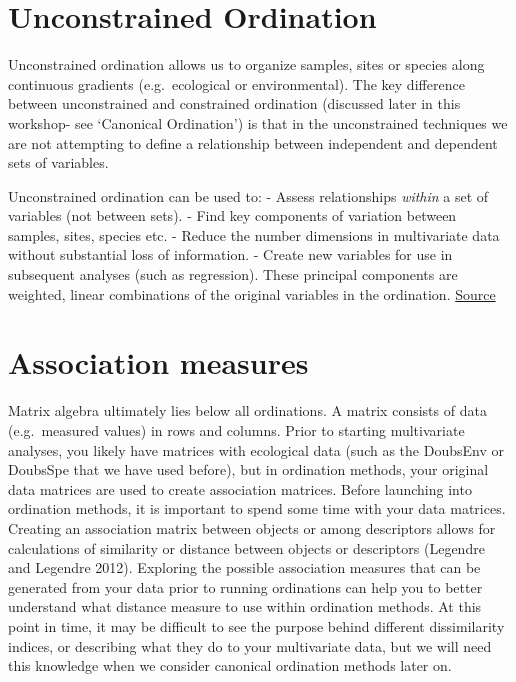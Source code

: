 \documentclass[
]{book}
\begin{document}
\hypertarget{unconstrained-ordination}{%
\chapter{Unconstrained Ordination}\label{unconstrained-ordination}}

Unconstrained ordination allows us to organize samples, sites or species
along continuous gradients (e.g.~ecological or environmental). The key
difference between unconstrained and constrained ordination (discussed
later in this workshop- see `Canonical Ordination') is that in the
unconstrained techniques we are not attempting to define a relationship
between independent and dependent sets of variables.

Unconstrained ordination can be used to: - Assess relationships \emph{within}
a set of variables (not between sets). - Find key components of
variation between samples, sites, species etc. - Reduce the number
dimensions in multivariate data without substantial loss of information.
- Create new variables for use in subsequent analyses (such as
regression). These principal components are weighted, linear
combinations of the original variables in the ordination.
\href{http://www.umass.edu/landeco/teaching/multivariate/schedule/ordination1.pdf}{Source}

\hypertarget{association-measures}{%
\chapter{Association measures}\label{association-measures}}

Matrix algebra ultimately lies below all ordinations. A matrix consists
of data (e.g.~measured values) in rows and columns. Prior to starting
multivariate analyses, you likely have matrices with ecological data
(such as the DoubsEnv or DoubsSpe that we have used before), but in
ordination methods, your original data matrices are used to create
association matrices. Before launching into ordination methods, it is
important to spend some time with your data matrices. Creating an
association matrix between objects or among descriptors allows for
calculations of similarity or distance between objects or descriptors
(Legendre and Legendre 2012). Exploring the possible association
measures that can be generated from your data prior to running
ordinations can help you to better understand what distance measure to
use within ordination methods. At this point in time, it may be
difficult to see the purpose behind different dissimilarity indices, or
describing what they do to your multivariate data, but we will need this
knowledge when we consider canonical ordination methods later on.
\end{document}
